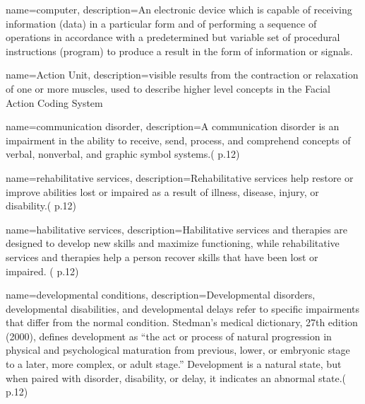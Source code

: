  {
	name={computer}, 
	description={An electronic device which is capable of receiving information (data) in a particular form and of performing a sequence of operations in accordance with a predetermined but variable set of procedural instructions (program) to produce a result in the form of information or signals.
}
}

 {
	name={Action Unit}, 
	description={visible results from the contraction or relaxation of one or more muscles, used to describe higher level concepts in the Facial Action Coding System
}%
}


 {
	name={communication disorder}, 
	description={A communication disorder is an impairment in the ability to receive, send, process, and comprehend concepts of verbal, nonverbal, and graphic symbol systems.(\cite{SLPathologies} p.12)
}
}

 {
	name={rehabilitative services}, 
	description={Rehabilitative services help restore or improve abilities lost or impaired as a result of illness, disease, injury, or disability.(\cite{SLPathologies} p.12)
}
}

 {
	name={habilitative services}, 
	description={Habilitative services and therapies are designed to develop new skills and maximize functioning, while rehabilitative services and therapies help a person recover skills that have been lost or impaired. (\cite{SLPathologies} p.12)
}
}

 {
	name={developmental conditions}, 
	description={Developmental disorders, developmental disabilities, and developmental delays refer to specific impairments that differ from the normal condition. Stedman’s medical dictionary, 27th edition (2000), defines development as “the act or process of natural progression in physical and psychological maturation from previous, lower, or embryonic stage to a later, more complex, or adult stage.” Development is a natural state, but when paired with disorder, disability, or delay, it indicates an abnormal state.(\cite{SLPathologies} p.12)
}
}

